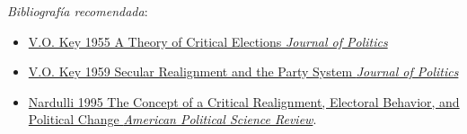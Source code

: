 \documentclass{article}
\begin{document}
\emph{Bibliografía recomendada}:

\begin{itemize}
\item \href{https://github.com/emagar/ep3/blob/master/lecturas/realineacion/key-Critical-elections1955jop.pdf}{V.O. Key 1955 A Theory of Critical Elections \emph{Journal of Politics}}
\item \href{https://github.com/emagar/ep3/blob/master/lecturas/realineacion/key-secular-realignmnt1959jop.pdf}{V.O. Key 1959 Secular Realignment and the Party System \emph{Journal of Politics}}
\item \href{https://github.com/emagar/ep3/blob/master/lecturas/realineacion/nardulli-Concept-critical-realignment1995apsr.pdf}{Nardulli 1995 The Concept of a Critical Realignment, Electoral Behavior, and Political Change \emph{American Political Science Review}}.
\end{itemize}
\end{document}
